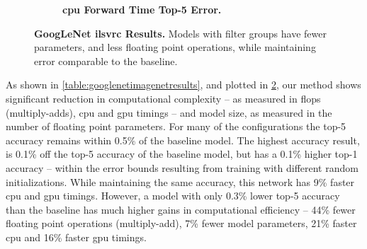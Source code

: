 \documentclass[thesis]{subfiles}
\begin{document}
\begin{figure}[p]
\begin{subfigure}[b]{\textwidth}
			\centering
			\caption{\textbf{\gls{cpu} Forward Time \vs Top-5 Error.}}
			\label{fig:googlenet50cpuforward}
		\end{subfigure}
		
		\caption[GoogLeNet \gls{ilsvrc} results]{\textbf{GoogLeNet \gls{ilsvrc} Results.} Models with filter groups have fewer parameters, and less floating point operations, while maintaining error comparable to the baseline.}
		\label{fig:googlenet50plots}
	\end{figure}
	
	As shown in \cref{table:googlenetimagenetresults}, and plotted in \cref{fig:googlenet50plots}, our method shows significant reduction in computational complexity -- as measured in \gls{flops} (multiply-adds), \gls{cpu} and \gls{gpu} timings -- and model size, as measured in the number of floating point parameters. For many of the configurations the top-5 accuracy remains within 0.5\% of the baseline model. 
	The highest accuracy result, is 0.1\% off the top-5 accuracy of the baseline model, but has a 0.1\% higher top-1 accuracy -- within the error bounds resulting from training with different random initializations. While maintaining the same accuracy, this network has 9\% faster \gls{cpu} and \gls{gpu} timings. However, a model with only 0.3\% lower top-5 accuracy than the baseline has much higher gains in computational efficiency -- 44\% fewer floating point operations (multiply-add), 7\% fewer model parameters, 21\% faster \gls{cpu} and 16\% faster \gls{gpu} timings.
	
\end{document}
